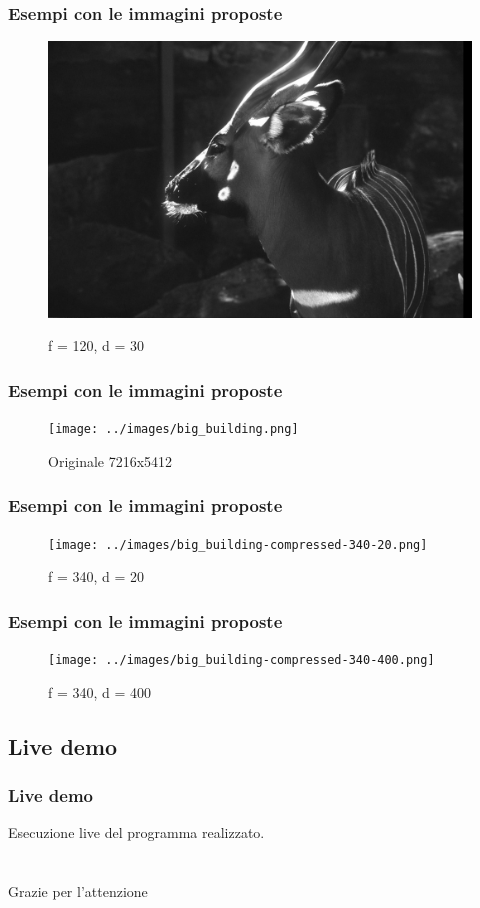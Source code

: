 \documentclass{beamer}
\begin{document}
\begin{frame}
	\frametitle{Esempi con le immagini proposte}
	\begin{figure}
		{\includegraphics[width=.8\linewidth]{../images/deer-compressed-120-30.png}}
		\caption{f = 120, d = 30}
	\end{figure}	
\end{frame}

\begin{frame}
	\frametitle{Esempi con le immagini proposte}
	\begin{figure}
		{\texttt{[image: ../images/big\_building.png]}}
		\caption{Originale 7216x5412}
	\end{figure}	
\end{frame}

\begin{frame}
	\frametitle{Esempi con le immagini proposte}
	\begin{figure}
		{\texttt{[image: ../images/big\_building-compressed-340-20.png]}}
		\caption{f = 340, d = 20}
	\end{figure}	
\end{frame}

\begin{frame}
	\frametitle{Esempi con le immagini proposte}
	\begin{figure}
		{\texttt{[image: ../images/big\_building-compressed-340-400.png]}}
		\caption{f = 340, d = 400}
	\end{figure}	
\end{frame}

\subsection{Live demo}
\begin{frame}
\frametitle{Live demo}
Esecuzione live del programma realizzato.
\end{frame}

\section*{}
\begin{frame}
\Huge{\centerline{Grazie per l'attenzione}}
\end{frame}
\end{document}
